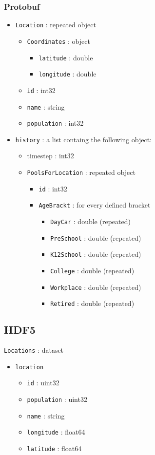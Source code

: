\subsubsection{Protobuf}
\begin{itemize}
\item \texttt{Location} : repeated object
\begin{itemize}
\item \texttt{Coordinates} : object
\begin{itemize}
\item \texttt{latitude} : double
\item \texttt{longitude} : double
\end{itemize}
\item \texttt{id} : int32
\item \texttt{name} : string
\item \texttt{population} : int32
\end{itemize}
\end{itemize}
\begin{itemize}

\item \texttt{history} : a list containg the following object:
\begin{itemize}
\item{timestep} : int32
\item \texttt{PoolsForLocation} : repeated object
\begin{itemize}
\item \texttt{id} : int32
\item \texttt{AgeBrackt} : for every defined bracket
\begin{itemize}
\item \texttt{DayCar}	 : double (repeated)
\item \texttt{PreSchool} : double (repeated)
\item \texttt{K12School} : double (repeated)
\item \texttt{College}	 : double (repeated)
\item \texttt{Workplace} : double (repeated)
\item \texttt{Retired}	 : double (repeated)
\end{itemize}
\end{itemize}
\end{itemize}
\end{itemize}

\subsection{HDF5}
\texttt{Locations} : dataset
\begin{itemize}
\item \texttt{location}
\begin{itemize}
\item \texttt{id} : uint32
\item \texttt{population} : uint32
\item \texttt{name} : string
\item \texttt{longitude} : float64
\item \texttt{latitude} : float64
\end{itemize}
\end{itemize}

